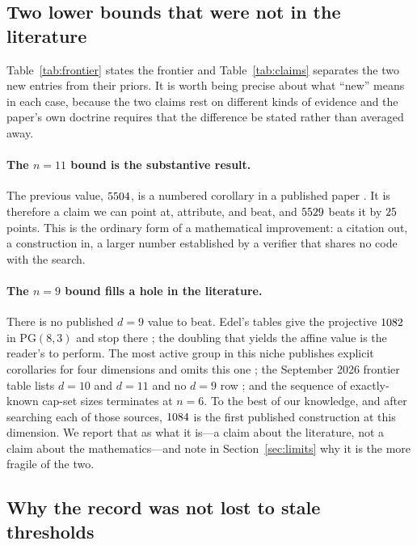 \documentclass[journal]{IEEEtran}
\begin{document}
\subsection{Two lower bounds that were not in the literature}
\label{sec:results-n9}

Table~\ref{tab:frontier} states the frontier and Table~\ref{tab:claims}
separates the two new entries from their priors. It is worth being precise
about what ``new'' means in each case, because the
two claims rest on different kinds of evidence and the paper's own doctrine
requires that the difference be stated rather than averaged away.

\paragraph{The $n=11$ bound is the substantive result.} The previous value,
$5504$, is a numbered corollary in a published paper
\cite{karapetyan2023,karapetyan2024}. It is therefore a claim we can point at,
attribute, and beat, and $5529$ beats it by $25$
points. This is the ordinary form of a mathematical improvement: a citation
out, a construction in, a larger number established by a verifier that shares
no code with the search.

\paragraph{The $n=9$ bound fills a hole in the literature.} There is no
published $d=9$ value to beat. Edel's tables give the projective
$1082$ in $\mathrm{PG}(8,3)$ and stop there
\cite{edel2004}; the doubling that yields the affine value is the reader's to
perform. The most active group in this niche publishes explicit corollaries
for four dimensions and omits this one \cite{karapetyan2023}; the September
2026 frontier table lists $d=10$ and $d=11$ and no $d=9$ row
\cite{endlessexam2026}; and the sequence of exactly-known cap-set sizes
\cite{oeis} terminates at $n=6$. To the best of our knowledge, and after
searching each of those sources, $1084$ is the first published
construction at this dimension. We report that as what it is---a claim about
the literature, not a claim about the mathematics---and note in
Section~\ref{sec:limits} why it is the more fragile of the two.

\subsection{Why the record was not lost to stale thresholds}
\end{document}
